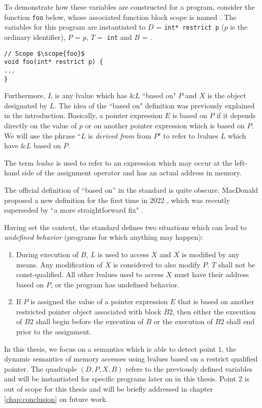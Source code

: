 To demonstrate how these variables are constructed for a program, 
consider the function \texttt{foo} below, whose associated function block scope is named .
The variables for this program are instantiated to
$D$ = \texttt{int* restrict p} (\ie $p$ is the ordinary identifier),
$P$ = $p$, $T = $ \texttt{int} and $B$ = .

\begin{code}
\begin{verbatim}
// Scope $\scope{foo}$
void foo(int* restrict p) {
...
}
\end{verbatim}
\end{code}

Furthermore, $L$ is any lvalue which has $\&L$ ``based on" $P$ and $X$ is the object designated by $L$.
The idea of the ``based on" definition was previously explained in the introduction.
Basically, a pointer expression $E$ is based on $P$ if it depends directly on the value of $p$ or on another pointer expression which is based on $P$.
We will use the phrase ``$L$ is \textit{derived from} from $P$" to refer to lvalues $L$ which have $\&L$ based on $P$. 

The term \textit{lvalue} is used to refer to an expression which may occur at the left-hand side of the
assignment operator and has an actual address in memory.


The official definition of ``based on'' in the standard is quite obscure.
MacDonald \etall proposed a new definition for the first time in 2022 \cite{defectmacdonald2022},
which was recently superseded by ``a more straightforward fix" \cite{defectr2macdonald2024}.

Having set the context, the standard defines two situations which can lead to \textit{undefined behavior}
(programs for which anything may happen):

\begin{enumerate}
    \item During execution of $B$, $L$ is used to access $X$ and $X$ is modified by any means.
    Any modification of $X$ is considered to also modify $P$.
    $T$ shall not be const-qualified.
    All other lvalues used to access $X$ must have their address based on $P$, or the program has undefined behavior.
    \item If $P$ is assigned the value of a pointer expression $E$ that is based on
    another restricted pointer object associated with block $B2$, then either the execution of $B2$ shall begin
    before the execution of $B$ or the execution of $B2$ shall end prior to the assignment.
\end{enumerate}

In this thesis, we focus on a semantics which is able to detect point $1$, \ie the dynamic semantics
of memory accesses using lvalues based on a restrict qualified pointer.
The quadruple $(D, P, X, B)$ refers to the previously defined variables and will
be instantiated for specific programs later on in this thesis.
Point $2$ is out of scope for this thesis and will be briefly addressed in chapter \ref{chap:conclusion} on future work.
